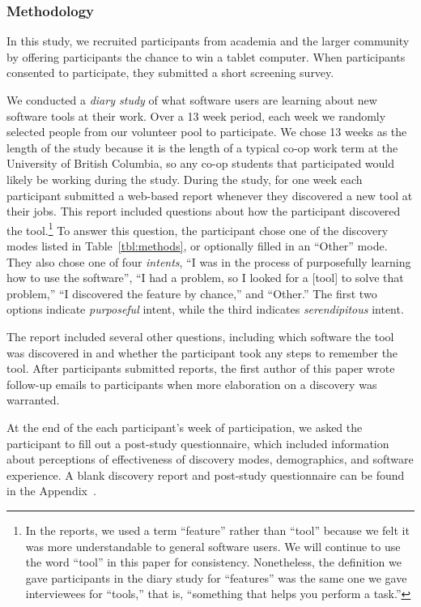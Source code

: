 \documentclass[smallextended]{svjour3}
\newcommand\context{mode\xspace}
\newcommand\contexts{modes\xspace}
\begin{document}
\subsubsection{Methodology}

\noindent
In this study, we recruited participants from academia and the larger community
by offering participants the chance to win a tablet computer.
When participants consented to participate, they submitted a short screening survey.

We conducted a \emph{diary study} of what software users 
are learning about new software tools at their work.
Over a 13 week period, each week we randomly selected people
from our volunteer pool to participate.
We chose 13 weeks as the length of the study because it is the 
length of a typical co-op work term at the University of British Columbia,
so any co-op students that participated would likely be working 
during the study.
During the study, for one week each participant submitted 
a web-based report whenever they discovered a new tool at their jobs.
This report included questions about how the participant discovered the 
tool.\footnote{In the reports, we used a term ``feature'' rather than ``tool''
because we felt it was more understandable to general software users.
We will continue to use the word ``tool'' in this paper for consistency.
Nonetheless, the definition we gave participants in the diary study for
``features'' was the same one we gave interviewees for ``tools,'' that is,
``something that helps you perform a task.''
}
To answer this question, the participant chose one of the discovery
\contexts listed in Table~\ref{tbl:methods}, or optionally filled in an
``Other'' \context.
They also chose one of four \emph{intents},
``I was in the process of purposefully learning how to use the software'',
``I had a problem, so I looked for a [tool] to solve that problem,''
``I discovered the feature by chance,'' and
``Other.''
The first two options indicate \emph{purposeful} intent, 
while the third indicates \emph{serendipitous} intent.
 
The report included several other questions, including which software the tool
was discovered in and whether the participant took any steps to remember the tool.
After participants submitted reports, the first author of this paper wrote follow-up
emails to participants when more elaboration on a discovery was warranted.

At the end of the each participant's week of participation, we asked the participant to 
fill out a post-study questionnaire, which included information about perceptions 
of effectiveness of discovery modes, demographics, and software experience.
A blank discovery report and post-study questionnaire can be found in the Appendix~\citep{appendix}.
 
\end{document}
